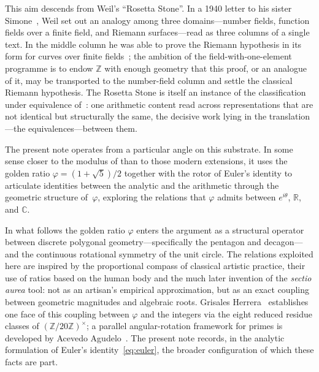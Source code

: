 \documentclass[11pt]{amsart}
\theoremstyle{definition}
\newcommand{\golden}{\varphi}
\newcommand{\Ztwenty}{(\mathbb{Z}/20\mathbb{Z})^{\times}}
\begin{document}
This aim descends from Weil's ``Rosetta Stone''.  In a 1940 letter to his
sister Simone~\cite{weil-1940}, Weil set out an analogy among three
domains---number fields, function fields over a finite field, and Riemann
surfaces---read as three columns of a single text.  In the middle column he
was able to prove the Riemann hypothesis in its form for curves over finite
fields~\cite{weil-1948}; the ambition of the field-with-one-element
programme is to endow $\mathbb{Z}$ with enough geometry that this proof, or
an analogue of it, may be transported to the number-field column and settle
the classical Riemann hypothesis.  The Rosetta Stone is itself an instance
of the classification under equivalence of~: one
arithmetic content read across representations that are not identical but
structurally the same, the decisive work lying in the translation---the
equivalences---between them.

The present note operates from a particular angle on this substrate.
In some sense closer to the modulus of  than
to those modern
extensions, it uses the golden ratio $\golden=(1+\sqrt{5})/2$
together with the rotor of Euler's identity to articulate identities
between the analytic and the arithmetic through the geometric
structure of~$\golden$, exploring the relations that $\golden$
admits between $e^{i\theta}$, $\mathbb{R}$, and $\mathbb{C}$.

In what follows the golden ratio $\golden$ enters the argument as a
structural operator between discrete polygonal geometry---specifically
the pentagon and decagon---and the continuous rotational symmetry of
the unit circle.  The relations exploited here are inspired by the
proportional compass of classical artistic practice, their use of
ratios based on the human body and the much later invention of the
\emph{sectio aurea} tool: not as an artisan's empirical
approximation, but as an exact coupling between geometric magnitudes
and algebraic roots.  Grisales Herrera~\cite{grisales} establishes
one face of this coupling between $\golden$ and the integers via the
eight reduced residue classes of $\Ztwenty$; a parallel
angular-rotation framework for primes is developed by Acevedo
Agudelo~\cite{acevedo-2021}.  The present note records, in the
analytic formulation of Euler's identity~\eqref{eq:euler}, the
broader configuration of which these facts are part.
\end{document}
